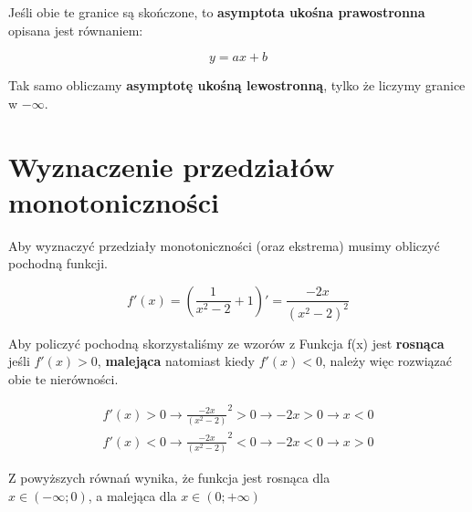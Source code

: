 \documentclass[10pt]{article}
\begin{document}
\noindent Jeśli obie te granice są skończone, to {\bf asymptota ukośna prawostronna} opisana jest równaniem:
{\large \begin{equation*}
y = ax + b
\end{equation*}

Tak samo obliczamy {\bf asymptotę ukośną lewostronną}, tylko że liczymy granice w $-\infty$. \newpage


\section{Wyznaczenie przedziałów monotoniczności}
Aby wyznaczyć przedziały monotoniczności (oraz ekstrema) musimy obliczyć pochodną funkcji.
{\large \begin{equation} \label{pochodna}
f'(x) = \left(\frac{1}{x^2 - 2} + 1\right)' = \frac{-2x}{(x^2-2)^2}
\end{equation}

\noindent Aby policzyć pochodną skorzystaliśmy ze wzorów z \cite{wzorki} 
Funkcja f(x) jest {\bf rosnąca} jeśli $f'(x) > 0$, {\bf malejąca} natomiast kiedy $f'(x) < 0$, należy więc rozwiązać obie te nierówności. 

{\large \begin{eqnarray}
f'(x) > 0 \rightarrow \frac{-2x}{(x^2 - 2)}^2 > 0 \rightarrow -2x > 0 \rightarrow x < 0 \\
f'(x) < 0 \rightarrow \frac{-2x}{(x^2 - 2)}^2 < 0 \rightarrow -2x < 0 \rightarrow x > 0
\end{eqnarray}}

\noindent Z powyższych równań wynika, że funkcja jest rosnąca dla \\ $x \in (-\infty; 0)$, a malejąca dla $x \in (0;+\infty)$
}}
\end{document}
